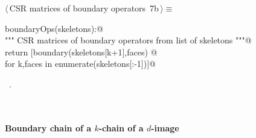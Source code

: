 \documentclass[11pt,oneside]{article}	%
\begin{document}
\begin{flushleft} \small
\begin{minipage}{\linewidth} \label{scrap11}
\protect{}$\langle\,$CSR matrices of boundary operators\nobreak\ {\footnotesize 7b}$\,\rangle\equiv$
\vspace{-1ex}
\begin{list}{}{} \item
\mbox{}\verb@def boundaryOps(skeletons):@\\
\mbox{}\verb@   """ CSR matrices of boundary operators from list of skeletons """@\\
\mbox{}\verb@   return [boundary(skeletons[k+1],faces) @\\
\mbox{}\verb@      for k,faces in enumerate(skeletons[:-1])]@\\
\mbox{}\verb@@{\NWsep}
\end{list}
\vspace{-1ex}
\footnotesize\addtolength{\baselineskip}{-1ex}
\begin{list}{}{\setlength{\itemsep}{-\parsep}\setlength{\itemindent}{-\leftmargin}}
\item \NWtxtMacroRefIn\ .
\end{list}
\end{minipage}\\[4ex]
\end{flushleft}


\paragraph{Boundary chain of a $k$-chain of a $d$-image}
\end{document}
